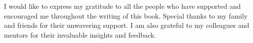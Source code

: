 I would like to express my gratitude to all the people who have supported and encouraged me throughout the writing of this book. Special thanks to my family and friends for their unwavering support. I am also grateful to my colleagues and mentors for their invaluable insights and feedback.
